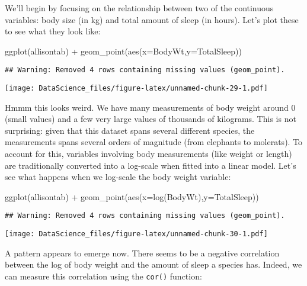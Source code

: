 \documentclass[
]{book}
\newenvironment{Shaded}{\begin{snugshade}}{\end{snugshade}}
\newcommand{\AttributeTok}[1]{\textcolor[rgb]{0.77,0.63,0.00}{#1}}
\newcommand{\FunctionTok}[1]{\textcolor[rgb]{0.00,0.00,0.00}{#1}}
\newcommand{\NormalTok}[1]{#1}
\newcommand{\SpecialCharTok}[1]{\textcolor[rgb]{0.00,0.00,0.00}{#1}}
\begin{document}
We'll begin by focusing on the relationship between two of the continuous variables: body size (in kg) and total amount of sleep (in hours). Let's plot these to see what they look like:

\begin{Shaded}
\begin{Highlighting}[]
\FunctionTok{ggplot}\NormalTok{(allisontab) }\SpecialCharTok{+} \FunctionTok{geom\_point}\NormalTok{(}\FunctionTok{aes}\NormalTok{(}\AttributeTok{x=}\NormalTok{BodyWt,}\AttributeTok{y=}\NormalTok{TotalSleep))}
\end{Highlighting}
\end{Shaded}

\begin{verbatim}
## Warning: Removed 4 rows containing missing values (geom_point).
\end{verbatim}

\texttt{[image: DataScience\_files/figure-latex/unnamed-chunk-29-1.pdf]}

Hmmm this looks weird. We have many measurements of body weight around 0 (small values) and a few very large values of thousands of kilograms. This is not surprising: given that this dataset spans several different species, the measurements spans several orders of magnitude (from elephants to molerats). To account for this, variables involving body measurements (like weight or length) are traditionally converted into a log-scale when fitted into a linear model. Let's see what happens when we log-scale the body weight variable:

\begin{Shaded}
\begin{Highlighting}[]
\FunctionTok{ggplot}\NormalTok{(allisontab) }\SpecialCharTok{+} \FunctionTok{geom\_point}\NormalTok{(}\FunctionTok{aes}\NormalTok{(}\AttributeTok{x=}\FunctionTok{log}\NormalTok{(BodyWt),}\AttributeTok{y=}\NormalTok{TotalSleep))}
\end{Highlighting}
\end{Shaded}

\begin{verbatim}
## Warning: Removed 4 rows containing missing values (geom_point).
\end{verbatim}

\texttt{[image: DataScience\_files/figure-latex/unnamed-chunk-30-1.pdf]}

A pattern appears to emerge now. There seems to be a negative correlation between the log of body weight and the amount of sleep a species has. Indeed, we can measure this correlation using the \texttt{cor()} function:
\end{document}
